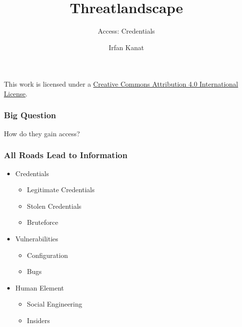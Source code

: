 \documentclass[aspectratio=169]{beamer}              %
\title{Threatlandscape}
\subtitle{Access: Credentials}
\author{Irfan Kanat}
\institute[CBS]{{Department of Digitization}\\ Copenhagen Business School}
\begin{document}
\begin{frame}

    \titlepage


    \vfill
    {\tiny \centering This work is licensed under a \href{http://creativecommons.org/licenses/by/4.0/}{Creative Commons Attribution 4.0 International License}.}

\end{frame}


\begin{frame}
    \frametitle{Big Question}
    
    \large How do they gain access?

\end{frame}


\begin{frame}
    \frametitle{All Roads Lead to Information}
    
    \begin{itemize}
        \item Credentials
        \begin{itemize}
            \item Legitimate Credentials
            \item Stolen Credentials
            \item Bruteforce
        \end{itemize}
        \item Vulnerabilities 
        \begin{itemize}
            \item Configuration
            \item Bugs
        \end{itemize}
        \item Human Element
        \begin{itemize}
            \item Social Engineering
            \item Insiders
        \end{itemize}
    \end{itemize}

\end{frame}
\end{document}
